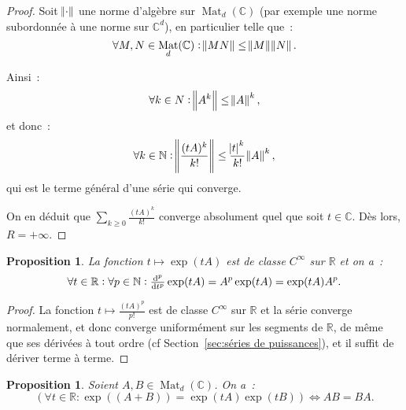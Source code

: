 \documentclass{report}
\newtheorem{prp}[thm]{Proposition}
\theoremstyle{definition}
\theoremstyle{remark}
\numberwithin{equation}{section}
\newcommand{\C}{\mathbb C}
\newcommand{\R}{\mathbb R}
\newcommand{\N}{\mathbb N}
\DeclareMathOperator{\Mat}{Mat}
\newcommand{\pinfty}{{+\infty}}
\begin{document}
			\begin{proof} Soit $\norm \cdot$ une norme d'algèbre sur $\Mat_d(\C)$ (par exemple une norme subordonnée à une norme sur $\C^d$), en particulier telle que~:
			\begin{equation}
				\forall M, N \in \Mat_d(\C) : \norm {MN} \leq \norm M\norm N.
			\end{equation}

			Ainsi~:
			\begin{equation}
				\forall k \in N : \norm {A^k} \leq \norm A^k,
			\end{equation}
			et donc~:
			\begin{equation}
				\forall k \in \N : \norm {\frac {(tA)^k}{k!}} \leq \frac {\abs t^k}{k!}\norm A^k,
			\end{equation}
			qui est le terme général d'une série qui converge.

			On en déduit que $\sum_{k \geq 0}\frac {(tA)^k}{k!}$ converge absolument quel que soit $t \in \C$. Dès lors, $R = \pinfty$.
			\end{proof}

			\begin{prp} La fonction $t \mapsto \exp(tA)$ est de classe $C^\infty$ sur $\R$ et on a~:
			\begin{equation}
				\forall t \in \R : \forall p \in \N : \od[p]{}t \exp(tA) = A^p\exp(tA) = \exp(tA)A^p.
			\end{equation}
			\end{prp}

			\begin{proof} La fonction $t \mapsto \frac {(tA)^p}{p!}$ est de classe $C^\infty$ sur $\R$ et la série converge normalement, et donc converge
			uniformément  sur les segments de $\R$, de même que ses dérivées à tout ordre (cf Section~\ref{sec:séries de puissances}), et il suffit de dériver
			terme à terme.
			\end{proof}

			\begin{prp} Soient $A, B \in \Mat_d(\C)$. On a~:
			\begin{equation}
				\left(\forall t \in \R : \exp\left((A+B)\right) = \exp(tA)\exp(tB)\right) \iff AB = BA.
			\end{equation}
			\end{prp}
\end{document}

